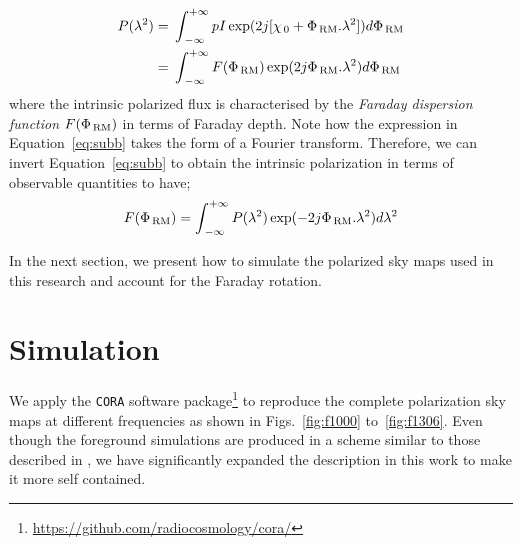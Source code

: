  \begin{subequations}\label{eq:sub}
 \begin{align}
  P(\lambda^2) &=\, \int_{\rm \, - \infty}^{+ \infty} pI\exp(2j[\chi_{\rm \, 0} + \Phi_{\rm \, RM}.\lambda^2 ]) d\Phi_{\rm \, RM} \label{eq:suba}\\
               &=\, \int_{\rm \, - \infty}^{+ \infty} F(\Phi_{\rm \, RM})\exp(2j\Phi_{\rm \, RM}.\lambda^2) d\Phi_{\rm \, RM} \label{eq:subb}
  \end{align}
 \end{subequations}
where the intrinsic polarized flux is characterised by the \emph{Faraday dispersion function} $F(\Phi_{\rm \, RM})$ in terms of Faraday depth.
Note how the expression in Equation~\ref{eq:subb} takes the form of a Fourier transform. Therefore, we can invert Equation~\ref{eq:subb}  to obtain the intrinsic
polarization in terms of observable quantities to have;
\begin{equation}\label{eq:invert}
F(\Phi_{\rm \, RM}) = \int_{\rm \, - \infty}^{+ \infty} P(\lambda^2)\exp(-2j\Phi_{\rm \, RM}.\lambda^2) d\lambda^2
\end{equation}


In the next section, we present how to simulate the polarized sky maps used in this research and account for the Faraday rotation. 


 \section{Simulation}    \label{sec:simulation}
We apply the \texttt{CORA} software package\footnote{{\url{https://github.com/radiocosmology/cora/}}} \citep{shaw2015coaxing,Shaw:2013} to reproduce the 
complete polarization sky maps at different frequencies as shown in Figs.~\ref{fig:f1000} to~\ref{fig:f1306}. Even though the foreground simulations
are produced in a scheme similar to those described in \cite{shaw2015coaxing}, we have significantly expanded the description in this work to make it more self contained. 
% 

